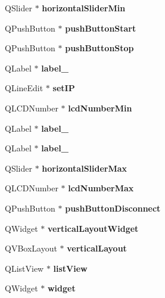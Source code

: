 \begin{DoxyCompactItemize}
\item 
\mbox{\label{class_ui___main_window_a1ef1c2be2f55c6d3261330e90adfe738}} 
Q\+Slider $\ast$ {\bfseries horizontal\+Slider\+Min}
\item 
\mbox{\label{class_ui___main_window_a7be02f76d2246891df190fe99399f3a7}} 
Q\+Push\+Button $\ast$ {\bfseries push\+Button\+Start}
\item 
\mbox{\label{class_ui___main_window_a3ac482a90bd0760ae9899843eba05ba0}} 
Q\+Push\+Button $\ast$ {\bfseries push\+Button\+Stop}
\item 
\mbox{\label{class_ui___main_window_a2f5576686ce98bcc41bd1b1eca07e56a}} 
Q\+Label $\ast$ {\bfseries label\+\_}
\item 
\mbox{\label{class_ui___main_window_a2b9f1785f6719c063ab248e7428bd074}} 
Q\+Line\+Edit $\ast$ {\bfseries set\+IP}
\item 
\mbox{\label{class_ui___main_window_acb0aaedbb69847beed374d571e9399bf}} 
Q\+L\+C\+D\+Number $\ast$ {\bfseries lcd\+Number\+Min}
\item 
\mbox{\label{class_ui___main_window_a253fbc5b44941384321b7c58cf96cc65}} 
Q\+Label $\ast$ {\bfseries label\+\_}
\item 
\mbox{\label{class_ui___main_window_a953dcd0e658a0903339e2ef3c94d4e7e}} 
Q\+Label $\ast$ {\bfseries label\+\_}
\item 
\mbox{\label{class_ui___main_window_a17fd1ba56a21573669f119f9810a633c}} 
Q\+Slider $\ast$ {\bfseries horizontal\+Slider\+Max}
\item 
\mbox{\label{class_ui___main_window_aaf820c9043e5f5fbaa62322b3a9b2814}} 
Q\+L\+C\+D\+Number $\ast$ {\bfseries lcd\+Number\+Max}
\item 
\mbox{\label{class_ui___main_window_aadc6379583df8659dbbd587a6cae904d}} 
Q\+Push\+Button $\ast$ {\bfseries push\+Button\+Disconnect}
\item 
\mbox{\label{class_ui___main_window_a805d415fff07a22a85219e1f22f2da28}} 
Q\+Widget $\ast$ {\bfseries vertical\+Layout\+Widget}
\item 
\mbox{\label{class_ui___main_window_aecd96a04789fcfec3f98d80390ad8184}} 
Q\+V\+Box\+Layout $\ast$ {\bfseries vertical\+Layout}
\item 
\mbox{\label{class_ui___main_window_aaf97aba343edd00a0114b406c2b77365}} 
Q\+List\+View $\ast$ {\bfseries list\+View}
\item 
\mbox{\label{class_ui___main_window_ab676f235c393f334b7c07935d4007925}} 
Q\+Widget $\ast$ {\bfseries widget}
\item 
\mbox{\label{class_ui___main_window_a0c01bad60d9f422a1258e710635a2f65}} 

\end{DoxyCompactItemize}
